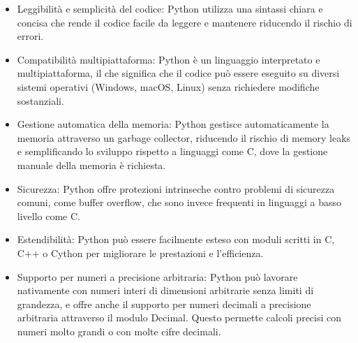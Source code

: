 \begin{itemize}
    \item Leggibilità e semplicità del codice: Python utilizza una sintassi 
    chiara e concisa che rende il codice facile da leggere e mantenere riducendo 
    il rischio di errori.
    \item Compatibilità multipiattaforma: Python è un linguaggio interpretato e 
    multipiattaforma, il che significa che il codice può essere eseguito su diversi 
    sistemi operativi (Windows, macOS, Linux) senza richiedere modifiche sostanziali.
    \item Gestione automatica della memoria: Python gestisce automaticamente la memoria 
    attraverso un garbage collector, riducendo il rischio di memory leaks e semplificando 
    lo sviluppo rispetto a linguaggi come C, dove la gestione manuale della memoria è richiesta.
    \item Sicurezza: Python offre protezioni intrinseche contro problemi di sicurezza 
    comuni, come buffer overflow, che sono invece frequenti in linguaggi a basso livello come C.
    \item Estendibilità: Python può essere facilmente esteso con moduli 
    scritti in C, C++ o Cython per migliorare le prestazioni e l'efficienza. 
    \item Supporto per numeri a precisione arbitraria: Python può lavorare nativamente con
    numeri interi di dimensioni arbitrarie senza limiti di grandezza, e
    offre anche il supporto per numeri decimali a precisione arbitraria attraverso il
    modulo Decimal. Questo permette calcoli precisi con numeri molto grandi o con molte
    cifre decimali.
\end{itemize}

